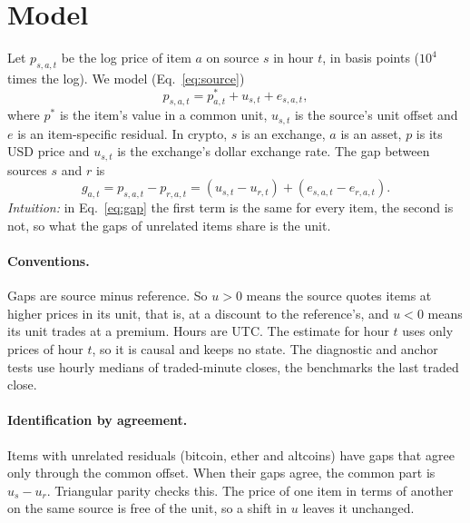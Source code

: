\documentclass[sigconf,review,anonymous]{acmart}
\begin{document}
\section{Model}
\label{sec:model}
Let $p_{s,a,t}$ be the log price of item $a$ on source $s$ in hour $t$, in basis points ($10^4$ times the log). We
model (Eq.~\eqref{eq:source})
\begin{equation}
p_{s,a,t} = p^*_{a,t} + u_{s,t} + e_{s,a,t},
\label{eq:source}
\end{equation}
where $p^*$ is the item's value in a common unit, $u_{s,t}$ is the source's unit offset and $e$ is an item-specific
residual. In crypto, $s$ is an exchange, $a$ is an asset, $p$ is its USD price and $u_{s,t}$ is the exchange's dollar
exchange rate. The gap between sources $s$ and $r$ is
\begin{equation}
g_{a,t} = p_{s,a,t}-p_{r,a,t} = (u_{s,t}-u_{r,t}) + (e_{s,a,t}-e_{r,a,t}).
\label{eq:gap}
\end{equation}
\emph{Intuition:} in Eq.~\eqref{eq:gap} the first term is the same for every item, the second is not, so what the gaps of unrelated items
share is the unit.

\paragraph{Conventions.} Gaps are source minus reference. So $u>0$ means the source quotes items at higher prices in its unit, that
is, at a discount to the reference's, and $u<0$ means its unit trades at a premium. Hours are UTC. The
estimate for hour $t$ uses only prices of hour $t$, so it is causal and keeps no state. The diagnostic and anchor tests use
hourly medians of traded-minute closes, the benchmarks the last traded close.

\paragraph{Identification by agreement.} Items with unrelated residuals (bitcoin, ether and altcoins) have gaps that
agree only through the common offset. When their gaps agree, the common part is $u_s-u_r$. Triangular parity checks this.
The price of one item in terms of another on the same source is free of the unit, so a shift in $u$ leaves it unchanged.
\end{document}
